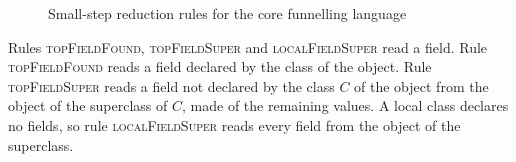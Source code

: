 \begin{figure}
\caption{Small-step reduction rules for the core funnelling language}
\label{fig:reduction}
\end{figure}

Rules \textsc{topFieldFound}, \textsc{topFieldSuper} and \textsc{localFieldSuper} read a field.
Rule \textsc{topFieldFound} reads a field declared by the class of the object.
Rule \textsc{topFieldSuper} reads a field not declared by the class $C$ of the object from the object of the superclass of $C$, made of the remaining values.
A local class declares no fields, so rule \textsc{localFieldSuper} reads every field from the object of the superclass.

